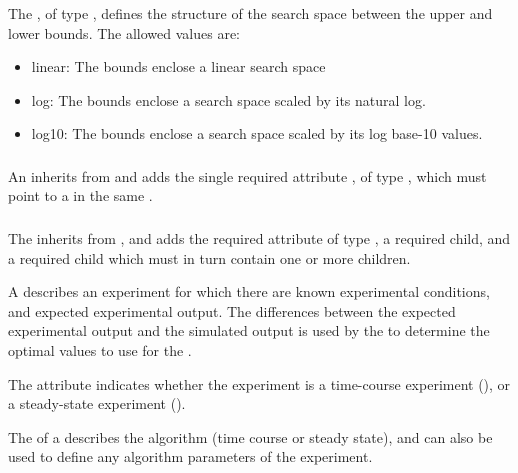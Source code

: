 The , of type \ScaleType, defines the structure of the search space between the upper and lower bounds.  The allowed values are:

\begin{itemize}
\item linear:  The bounds enclose a linear search space
\item log:  The bounds enclose a search space scaled by its natural log.
\item log10:  The bounds enclose a search space scaled by its log base-10 values.
\end{itemize}


\subsubsection{}
\label{class:experimentReference}

An \ExperimentReference inherits from \SedBase and adds the single required attribute , of type \SIdRef, which must point to a \FitExperiment in the same \ParameterEstimationTask.  


\subsubsection{}
\label{class:fitExperiment}
\label{class:listOfFitMappings}

The \FitExperiment inherits from \SedBase, and adds the required attribute  of type \ExperimentType, a required \Algorithm child, and a required \ListOfFitMappings child which must in turn contain one or more \FitMapping children.


A \FitExperiment describes an experiment for which there are known experimental conditions, and expected experimental output.  The differences between the expected experimental output and the simulated output is used by the \Objective to determine the optimal values to use for the \AdjustableParameters.


The  attribute indicates whether the experiment is a time-course experiment (), or a steady-state experiment ().

The \Algorithm of a \FitExperiment describes the algorithm (time course or steady state), and can also be used to define any algorithm parameters of the experiment.

